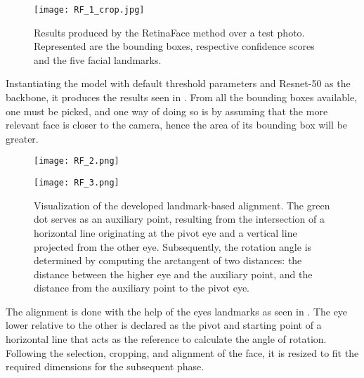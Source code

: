 \documentclass[class=report, crop=false, a4paper, 12pt]{standalone}
\begin{document}
\begin{figure}[!h]
    \centering
    \texttt{[image: RF\_1\_crop.jpg]}
    \caption[Results produced by the RetinaFace method over a test photo.]{Results produced by the RetinaFace method over a test photo. Represented are the bounding boxes, respective confidence scores and the five facial landmarks.}
    \label{fig:rf_1}
\end{figure}

Instantiating the model with default threshold parameters and Resnet-50 as the backbone, it produces the results seen in . From all the bounding boxes available, one must be picked, and one way of doing so is by assuming that the more relevant face is closer to the camera, hence the area of its bounding box will be greater.

\begin{figure}[h]
    \centering
    \begin{minipage}[c]{0.48\textwidth}
      \centering
      \texttt{[image: RF\_2.png]}
      \label{fig:rf_2}
    \end{minipage}
    \hfill
    \begin{minipage}[c]{0.48\textwidth}
      \centering
      \texttt{[image: RF\_3.png]}
      \label{fig:rf_3}
    \end{minipage} 
    \caption[Visualization of the developed landmark-based alignment.]{Visualization of the developed landmark-based alignment. The green dot serves as an auxiliary point, resulting from the intersection of a horizontal line originating at the pivot eye and a vertical line projected from the other eye. Subsequently, the rotation angle is determined by computing the arctangent of two distances: the distance between the higher eye and the auxiliary point, and the distance from the auxiliary point to the pivot eye.}
    \label{fig:rf_2_3}
\end{figure}

\par The alignment is done with the help of the eyes landmarks as seen in . The eye lower relative to the other is declared as the pivot and starting point of a horizontal line that acts as the reference to calculate the angle of rotation. Following the selection, cropping, and alignment of the face, it is resized to fit the required dimensions for the subsequent phase.
\end{document}
